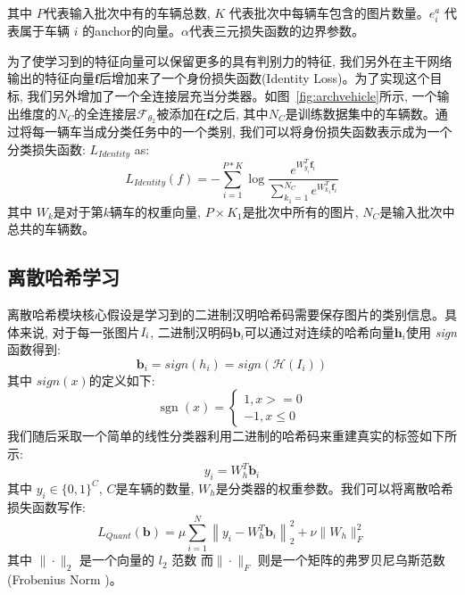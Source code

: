 其中 $P$代表输入批次中有的车辆总数, $K$ 代表批次中每辆车包含的图片数量。$e_{i}^a$ 代表属于车辆 $i$ 的anchor的向量。$\alpha$代表三元损失函数的边界参数。\par
为了使学习到的特征向量可以保留更多的具有判别力的特征, 我们另外在主干网络输出的特征向量$\mathbf{f}$后增加来了一个身份损失函数(Identity Loss)。为了实现这个目标, 我们另外增加了一个全连接层充当分类器。如图~\ref{fig:archvehicle}所示, 一个输出维度的$N_C$的全连接层$\mathcal{F}_{\theta_2}$被添加在$\mathbf{f}$之后, 其中$N_C$是训练数据集中的车辆数。通过将每一辆车当成分类任务中的一个类别, 我们可以将身份损失函数表示成为一个分类损失函数:
 $L_{Identity}$ as:
\begin{equation}
L_{Identity}(f)=-\sum_{i=1}^{P*K} \log \frac{e^{{W}_{y_{i}}^{T} \mathbf{f}_i }}{\sum_{k_1=1}^{N_C} e^{{W}_{k_1}^{T} \mathbf{f}_{i}}}
\label{eq:identity}
\end{equation}
其中 $W_k$是对于第$k$辆车的权重向量, $P \times K_1$是批次中所有的图片, $N_C$是输入批次中总共的车辆数。
\subsection{离散哈希学习}
离散哈希模块核心假设是学习到的二进制汉明哈希码需要保存图片的类别信息。具体来说, 对于每一张图片$\it{I}_i$, 二进制汉明码$\mathbf{b}_i$可以通过对连续的哈希向量$\mathbf{h}_i$使用 \textit{sign} 函数得到:
\begin{equation}
    \mathbf{b}_i = \textit{sign}(h_i) = \textit{sign}(\mathcal{H}(\textit{I}_i))
\end{equation}
其中 $\textit{sign}(x)$的定义如下:
\begin{equation}
\operatorname{sgn}(x)=\left\{\begin{array}{c}
1, x>=0 \\
-1, x \le 0 
\end{array}\right.
\end{equation}
我们随后采取一个简单的线性分类器利用二进制的哈希码来重建真实的标签如下所示:
\begin{equation}
    y_i = W^T_h\mathbf{b}_i
\end{equation}
其中  $y_i \in \{0,1\}^C$, $C$是车辆的数量, $W_h$是分类器的权重参数。我们可以将离散哈希损失函数写作:
\begin{equation}
    L_{Quant}(\mathbf{b}) =  \mu\sum_{i=1}^{N}\left\|y_{i}-W^{T}_h \mathbf{b}_{i}\right\|_{2}^{2}+\nu \|W_h\|_{F}^{2}  
\end{equation}
其中 $\|\cdot\|_{2}$ 是一个向量的 $l_2$ 范数 而$\|\cdot\|_{F}$ 则是一个矩阵的弗罗贝尼乌斯范数 (Frobenius Norm )。
